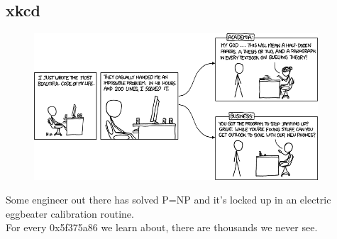 \documentclass{beamer}
\begin{document}
\subsection{xkcd}
\begin{frame}[plain]
  \begin{figure}
    \begin{center}
      \includegraphics[width=300pt]{academia_vs_business.png}
    \end{center}
  \end{figure}
  \begin{center}
    {\tiny Some engineer out there has solved P=NP and it's locked up in an electric eggbeater calibration routine.\\
          For every 0x5f375a86 we learn about, there are thousands we never see.}
  \end{center}
\end{frame}
\end{document}
